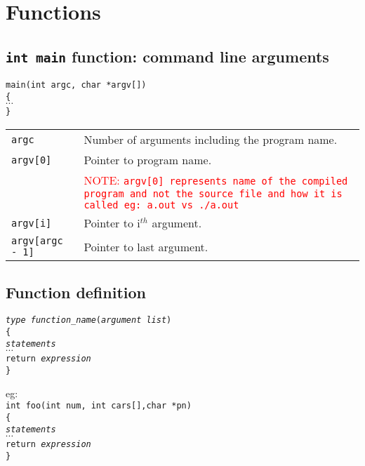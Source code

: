 \section{Functions}

\subsection{\texttt{int main} function: command line arguments}

\texttt{main(int argc, char *argv[])}\\
\texttt{\{}\\
\qquad \texttt{$\cdots$}\\
\texttt{\}}

\begin{tabularx}{\linewidth}{l|X}
\texttt{argc} & Number of arguments including the program name. \\
\texttt{argv[0]} & Pointer to program name.\\
& \textcolor{red}{NOTE: \texttt{argv[0] represents name of the compiled program and not the source file and how it is called eg: \texttt{a.out} vs \texttt{./a.out}}}\\
\texttt{argv[i]} & Pointer to i$^{th}$ argument.\\
\texttt{argv[argc - 1]} & Pointer to last argument. \\
\end{tabularx}




\subsection{Function definition}
\texttt{\textit{type function\_name}(\textit{argument list})}\\
\texttt{\{}\\
\qquad \texttt{\textit{statements}}\\
\qquad \texttt{$ \cdots $}\\
\qquad \texttt{return \textit{expression}}\\
\texttt{\}}

eg:\\

\texttt{int foo(int num, int cars[],char *pn)}\\
\texttt{\{}\\
\qquad \texttt{\textit{statements}}\\
\qquad \texttt{$ \cdots $}\\
\qquad \texttt{return \textit{expression}}\\
\texttt{\}}

